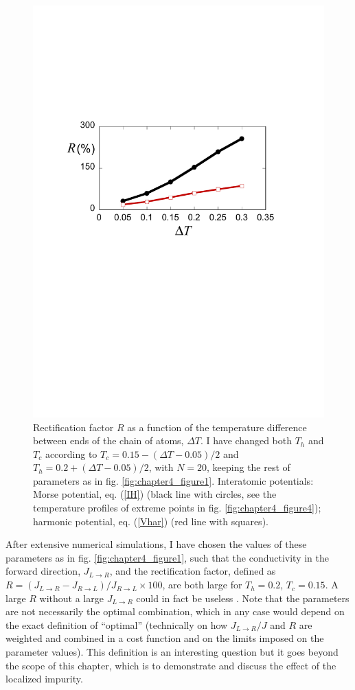 \begin{figure}
\centering
\includegraphics[width=0.65\linewidth]{Figures/FIG5new.pdf}
\caption{Rectification factor $R$ as a function of the temperature difference between ends of the chain of atoms, $\Delta T$.
I have changed both $T_h$ and $T_c$ according to $T_c=0.15-(\Delta T-0.05)/2$ and $T_h=0.2+(\Delta T-0.05)/2$, with $N=20$,  keeping the rest of parameters as in fig. \ref{fig:chapter4_figure1}.
Interatomic potentials: Morse potential, eq. (\ref{IH}) (black line with circles, see the temperature profiles of extreme points in fig. \ref{fig:chapter4_figure4}); harmonic potential, eq. (\ref{Vhar}) (red line with squares).}
\label{fig:chapter4_figure5}
\end{figure}

After extensive numerical simulations, I have chosen the values of these parameters as in fig. \ref{fig:chapter4_figure1}, such that the conductivity in the forward direction, $J_{L\rightarrow R}$, and the rectification factor, defined as $R=(J_{L\rightarrow R}-J_{R\rightarrow L}) / J_{R\rightarrow L}\times 100$,
are both large for $T_h=0.2$, $T_c=0.15$. A large $R$ without a large $J_{L\rightarrow R}$ could in fact be useless \cite{Roberts2011}.
Note that the parameters are not necessarily the optimal combination, which in any case would depend on the exact definition of ``optimal'' (technically on how $J_{L\rightarrow R}/J$ and $R$ are weighted and combined in a cost function and on the limits imposed on the
parameter values). This definition is an interesting question but it goes beyond the scope of this chapter, which is to demonstrate and discuss the effect of the localized impurity.

